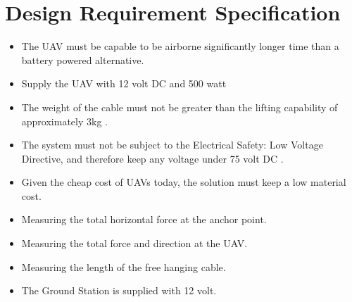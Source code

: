 \section{Design Requirement Specification}
\begin{itemize}
\item The UAV must be capable to be airborne significantly longer time than a battery powered alternative.
\item Supply the UAV with 12 volt DC and 500 watt
\item The weight of the cable must not be greater than the lifting capability of approximately 3kg \cite{Sidea2013}.
\item The system must not be subject to the Electrical Safety: Low Voltage Directive, and therefore keep any voltage under 75 volt DC \cite{Parliament2006}.
\item Given the cheap cost of UAVs today, the solution must keep a low material cost.
\item Measuring the total horizontal force at the anchor point.
\item Measuring the total force and direction at the UAV.
\item Measuring the length of the free hanging cable.
\item The Ground Station is supplied with 12 volt.
\end{itemize}





